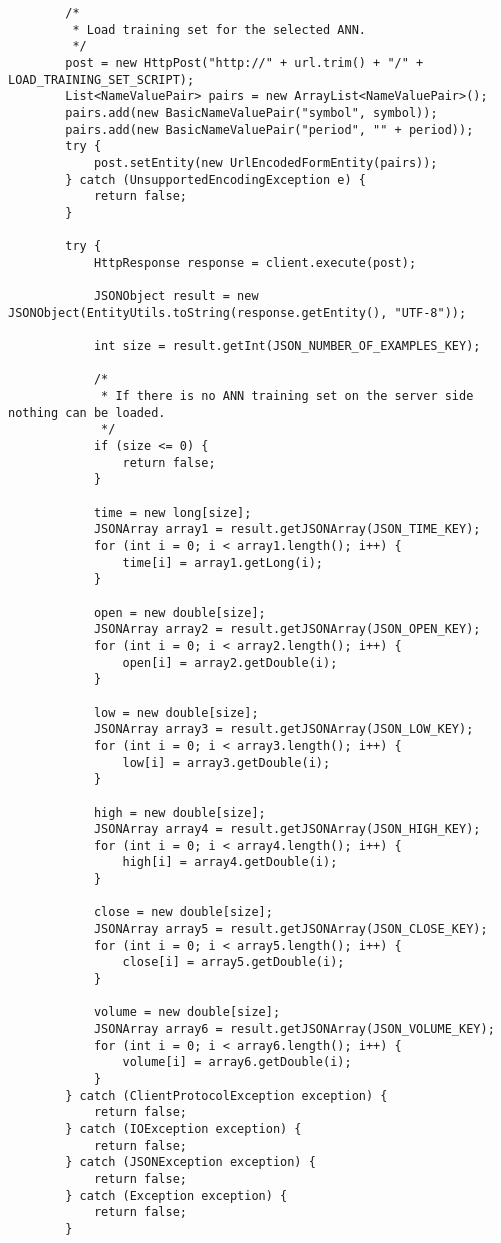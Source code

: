 \begin{verbatim}
        /*
         * Load training set for the selected ANN.
         */
        post = new HttpPost("http://" + url.trim() + "/" + LOAD_TRAINING_SET_SCRIPT);
        List<NameValuePair> pairs = new ArrayList<NameValuePair>();
        pairs.add(new BasicNameValuePair("symbol", symbol));
        pairs.add(new BasicNameValuePair("period", "" + period));
        try {
            post.setEntity(new UrlEncodedFormEntity(pairs));
        } catch (UnsupportedEncodingException e) {
            return false;
        }

        try {
            HttpResponse response = client.execute(post);

            JSONObject result = new JSONObject(EntityUtils.toString(response.getEntity(), "UTF-8"));

            int size = result.getInt(JSON_NUMBER_OF_EXAMPLES_KEY);

            /*
             * If there is no ANN training set on the server side nothing can be loaded.
             */
            if (size <= 0) {
                return false;
            }

            time = new long[size];
            JSONArray array1 = result.getJSONArray(JSON_TIME_KEY);
            for (int i = 0; i < array1.length(); i++) {
                time[i] = array1.getLong(i);
            }

            open = new double[size];
            JSONArray array2 = result.getJSONArray(JSON_OPEN_KEY);
            for (int i = 0; i < array2.length(); i++) {
                open[i] = array2.getDouble(i);
            }

            low = new double[size];
            JSONArray array3 = result.getJSONArray(JSON_LOW_KEY);
            for (int i = 0; i < array3.length(); i++) {
                low[i] = array3.getDouble(i);
            }

            high = new double[size];
            JSONArray array4 = result.getJSONArray(JSON_HIGH_KEY);
            for (int i = 0; i < array4.length(); i++) {
                high[i] = array4.getDouble(i);
            }

            close = new double[size];
            JSONArray array5 = result.getJSONArray(JSON_CLOSE_KEY);
            for (int i = 0; i < array5.length(); i++) {
                close[i] = array5.getDouble(i);
            }

            volume = new double[size];
            JSONArray array6 = result.getJSONArray(JSON_VOLUME_KEY);
            for (int i = 0; i < array6.length(); i++) {
                volume[i] = array6.getDouble(i);
            }
        } catch (ClientProtocolException exception) {
            return false;
        } catch (IOException exception) {
            return false;
        } catch (JSONException exception) {
            return false;
        } catch (Exception exception) {
            return false;
        }


\end{verbatim}
